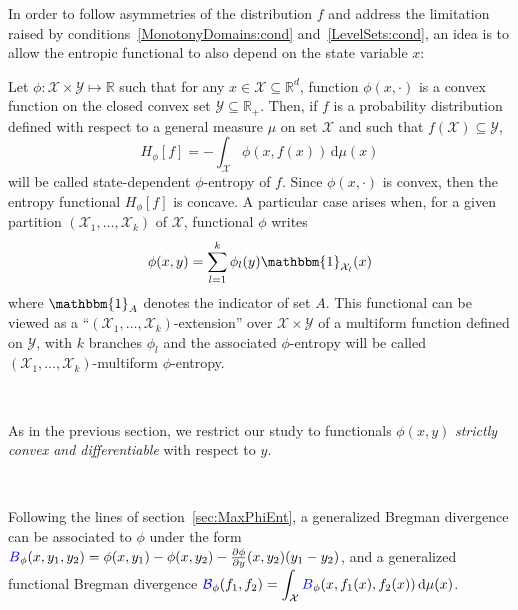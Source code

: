 \documentclass[entropy,article,submit,moreauthors,pdftex]{Definitions/mdpi}
\newcommand{\SZ}[1]{{\color{blue} #1}}                                       %
\def\dmu{\mathrm{d}\mu}%
\def\fB{\mathcal{B}}%
\def\Rset{\mathbb{R}}%
\def\X{\mathcal{X}}%
\def\Y{\mathcal{Y}}%
\def\un{\mathbbm{1}}%
\begin{document}
In  order  to  follow  asymmetries  of the  distribution  $f$  and  address  the
limitation       raised       \SZ{by       conditions~\ref{MonotonyDomains:cond}
  and~\ref{LevelSets:cond}}, an idea is to allow the entropic functional to also
depend on the state variable $x$:
%
\begin{Definition}
\label{def:asym_phi-entropy}
%
  Let $\phi: \X \times  \Y \mapsto \Rset$ such that for any  $x \in \X \subseteq
  \Rset^d$, function $\phi(x,\cdot)$  is a convex function on  the closed convex
  set  $\Y \subseteq  \Rset_+$.   Then,  if $f$  is  a probability  distribution
  defined with  respect to  a general measure  $\mu$ on set  $\X$ and  such that
  $f(\X) \subseteq \Y$,
  \begin{equation}\label{eq:asym_phi-entropy}
  H_\phi[f] = - \int_\X \phi(x,f(x)) \, \dmu(x)
  \end{equation}
  will be  called state-dependent $\phi$-entropy of  $f$.  Since $\phi(x,\cdot)$
  is convex, then the entropy functional $H_\phi[f]$ is concave.
  A particular case arises when, for  a given partition $(\X_1 , \ldots , \X_k)$
  of $\X$, functional $\phi$ writes
  \begin{equation}\label{eq:multiform_phi-entropy}
  \phi(x,y) = \sum_{l=1}^k \phi_l(y) \un_{\X_l}(x)
  \end{equation}
  where $\un_A$ denotes the indicator of set $A$.  This functional can be viewed
  as a ``$(\X_1 , \ldots , \X_k)$-extension'' over $\X \times \Y$ of a multiform
  function  defined on  $\Y$,  with  $k$ branches  $\phi_l$  and the  associated
  $\phi$-entropy   will   be  called   $(\X_1   ,   \ldots  ,   \X_k)$-multiform
  $\phi$-entropy.
\end{Definition}

\

As in  the previous section,  we restrict  our study to  functionals $\phi(x,y)$
{\em strictly convex and differentiable} \SZ{with respect to} $y$.

\

Following  the  lines  of  section~\ref{sec:MaxPhiEnt},  a  generalized  Bregman
divergence  can be  associated to  $\phi$  under the  form $\SZ{B}_\phi(x,y_1,y_2)  =
\phi(x,y_1) - \phi(x,y_2) - \frac{\partial \phi}{\partial y}(x,y_2) \left( y_1 -
y_2  \right)$, and  a generalized  functional Bregman  divergence $\displaystyle
\SZ{\fB}_\phi(f_1,f_2) = \int_\X \SZ{B}_\phi(x,f_1(x),f_2(x)) \, \dmu(x)$.

\
\end{document}
